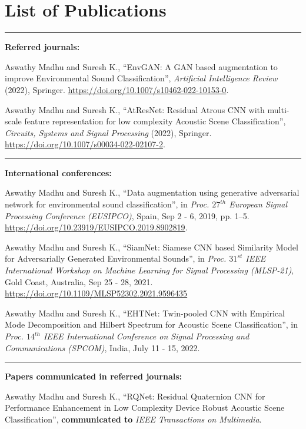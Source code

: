 \chapter*{List of Publications} \label{publications}
\noindent\rule{\linewidth}{2pt}
\textbf{{\large Referred journals:}}
\begin{enumerate}[label=\textbf{[\arabic*]}]
\item Aswathy Madhu and Suresh K., ``EnvGAN: A GAN based
augmentation to improve Environmental Sound Classification'',
\emph{Artificial Intelligence Review} (2022), Springer.
\url{https://doi.org/10.1007/s10462-022-10153-0}.
\item Aswathy Madhu and Suresh K., ``AtResNet: Residual Atrous CNN
with multi-scale feature representation for low complexity Acoustic Scene
Classification'', \emph{Circuits, Systems and Signal Processing} (2022),
Springer.
\url{https://doi.org/10.1007/s00034-022-02107-2}.
\end{enumerate}
\noindent\rule{\linewidth}{0.2pt}
\textbf{{\large International conferences:}}
\begin{enumerate}[label=\textbf{[\arabic*]}]
\item Aswathy Madhu and Suresh K., ``Data augmentation using
generative adversarial network for environmental sound classification'', in
\emph{Proc. $27^{th}$ European Signal Processing Conference (EUSIPCO)},
Spain, Sep 2 - 6, 2019, pp. 1–5.  \url{https://doi.org/10.23919/EUSIPCO.2019.8902819}.
\item Aswathy Madhu and Suresh K., ``SiamNet: Siamese CNN based Similarity Model for Adversarially Generated Environmental Sounds'', in \emph{Proc. $31^{st}$ IEEE International Workshop on Machine Learning for
Signal Processing (MLSP-21)}, Gold Coast, Australia, Sep 25 - 28, 2021. \url{https://doi.org/10.1109/MLSP52302.2021.9596435}
\item Aswathy Madhu and Suresh K., ``EHTNet: Twin-pooled CNN with Empirical Mode Decomposition and Hilbert Spectrum for Acoustic Scene Classification'', in \emph{Proc. $14^{th}$ IEEE International Conference on Signal Processing and Communications (SPCOM)}, India, July 11 - 15, 2022.
\end{enumerate}
\noindent\rule{\linewidth}{0.2pt}
\textbf{{\large Papers communicated in referred journals:}}
\begin{enumerate}[label=\textbf{[\arabic*]}]
\item Aswathy Madhu and Suresh K., ``RQNet: Residual Quaternion
CNN for Performance Enhancement in Low Complexity Device Robust
Acoustic Scene Classification'', \textbf{communicated to} \emph{IEEE
Transactions on Multimedia}.
\end{enumerate}